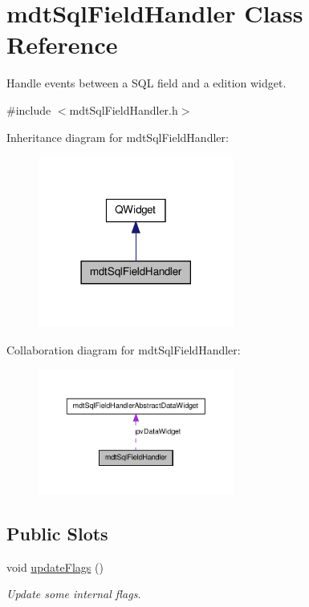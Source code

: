 \hypertarget{classmdt_sql_field_handler}{\section{mdt\-Sql\-Field\-Handler Class Reference}
\label{classmdt_sql_field_handler}
}


Handle events between a S\-Q\-L field and a edition widget.  




{\ttfamily \#include $<$mdt\-Sql\-Field\-Handler.\-h$>$}



Inheritance diagram for mdt\-Sql\-Field\-Handler\-:\nopagebreak
\begin{figure}[H]
\begin{center}
\leavevmode
\includegraphics[width=182pt]{classmdt_sql_field_handler__inherit__graph}
\end{center}
\end{figure}


Collaboration diagram for mdt\-Sql\-Field\-Handler\-:\nopagebreak
\begin{figure}[H]
\begin{center}
\leavevmode
\includegraphics[width=182pt]{classmdt_sql_field_handler__coll__graph}
\end{center}
\end{figure}
\subsection*{Public Slots}
\begin{DoxyCompactItemize}
\item 
void \hyperlink{classmdt_sql_field_handler_a7bb4e75ab209bdd2609cf458b5ce8868}{update\-Flags} ()
\begin{DoxyCompactList}\small\item\em Update some internal flags. \end{DoxyCompactList}\end{DoxyCompactItemize}
